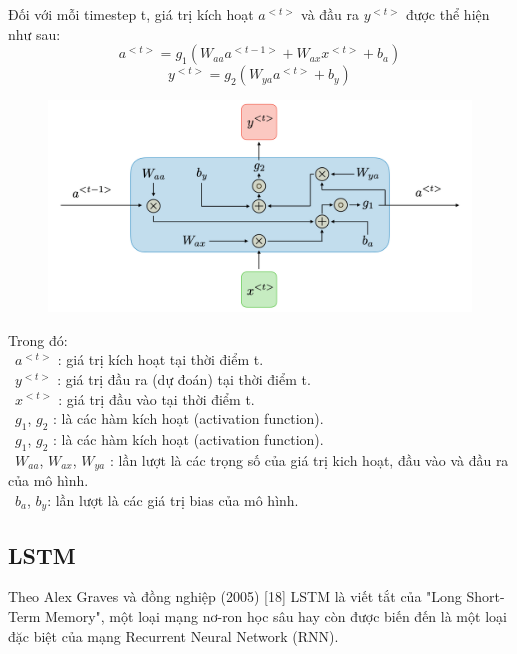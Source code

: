 \documentclass[conference]{IEEEtran}
\begin{document}
Đối với mỗi timestep t, giá trị kích hoạt \(a^{<t>}\) và đầu ra \(y^{<t>}\) được thể hiện như sau:
\[a^{<t>} = g_1(W_{aa}a^{<t-1>} + W_{ax}x^{<t>} + b_a)\]
\[y^{<t>} = g_2(W_{ya}a^{<t>} + b_y)\]

\begin{figure}[H]
    \centering
    \begin{minipage}{0.5\textwidth}
    \centering
    \includegraphics[width=1\textwidth]{Image/RNN2.png}
    \label{fig:1}
    \end{minipage}
\end{figure}
Trong đó:\\
	\indent\textbullet\ \(a^{<t>}\) : giá trị kích hoạt tại thời điểm t. \\
	\indent\textbullet\ \(y^{<t>}\) : giá trị đầu ra (dự đoán) tại thời điểm t. \\
 	\indent\textbullet\ \(x^{<t>}\) : giá trị đầu vào tại thời điểm t. \\
 	\indent\textbullet\ \(g_1\), \(g_2\) : là các hàm kích hoạt (activation function). \\
 	\indent\textbullet\ \(g_1\), \(g_2\) : là các hàm kích hoạt (activation function). \\
   	\indent\textbullet\ \(W_{aa}\), \(W_{ax}\), \(W_{ya}\) : lần lượt là các trọng số của giá trị kich hoạt, đầu vào và đầu ra của mô hình. \\
   	\indent\textbullet\ \(b_a\), \(b_y\): lần lượt là các giá trị bias của mô hình. \\
\subsection{LSTM}
Theo Alex Graves và đồng nghiệp (2005) [18] LSTM là viết tắt của "Long Short-Term Memory", một loại mạng nơ-ron học sâu hay còn được biến đến là một loại đặc biệt của mạng Recurrent Neural Network (RNN).
\end{document}
